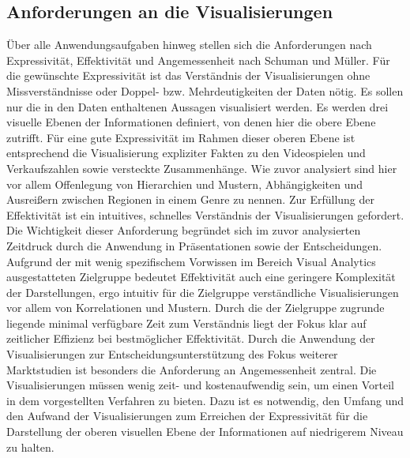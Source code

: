 \documentclass[usegeometry=true]{scrartcl}
\begin{document}
\subsection{Anforderungen an die Visualisierungen}
Über alle Anwendungsaufgaben hinweg stellen sich die Anforderungen nach Expressivität, Effektivität und Angemessenheit nach Schuman und Müller.\cite[9ff.]{Schumann.2000}
Für die gewünschte Expressivität ist das Verständnis der Visualisierungen ohne Missverständnisse oder Doppel- bzw. Mehrdeutigkeiten der Daten nötig. 
Es sollen nur die in den Daten enthaltenen Aussagen visualisiert werden. 
Es werden drei visuelle Ebenen der Informationen definiert, von denen hier die obere Ebene zutrifft.\cite{Bertin.1982}
Für eine gute Expressivität im Rahmen dieser oberen Ebene ist entsprechend die Visualisierung expliziter Fakten zu den Videospielen und Verkaufszahlen sowie versteckte Zusammenhänge. 
Wie zuvor analysiert sind hier vor allem Offenlegung von Hierarchien und Mustern, Abhängigkeiten und Ausreißern zwischen Regionen in einem Genre zu nennen.
Zur Erfüllung der Effektivität ist ein intuitives, schnelles Verständnis der Visualisierungen gefordert.
Die Wichtigkeit dieser Anforderung begründet sich im zuvor analysierten Zeitdruck durch die Anwendung in Präsentationen sowie der Entscheidungen.
Aufgrund der mit wenig spezifischem Vorwissen im Bereich Visual Analytics ausgestatteten Zielgruppe bedeutet Effektivität auch eine geringere Komplexität der Darstellungen, ergo intuitiv für die Zielgruppe verständliche Visualisierungen vor allem von Korrelationen und Mustern.
Durch die der Zielgruppe zugrunde liegende minimal verfügbare Zeit zum Verständnis liegt der Fokus klar auf zeitlicher Effizienz bei bestmöglicher Effektivität.
Durch die Anwendung der Visualisierungen zur Entscheidungsunterstützung des Fokus weiterer Marktstudien ist besonders die Anforderung an Angemessenheit zentral. 
Die Visualisierungen müssen wenig zeit- und kostenaufwendig sein, um einen Vorteil in dem vorgestellten Verfahren zu bieten. 
Dazu ist es notwendig, den Umfang und den Aufwand der Visualisierungen zum Erreichen der Expressivität für die Darstellung der oberen visuellen Ebene der Informationen auf niedrigerem Niveau zu halten.
\end{document}
